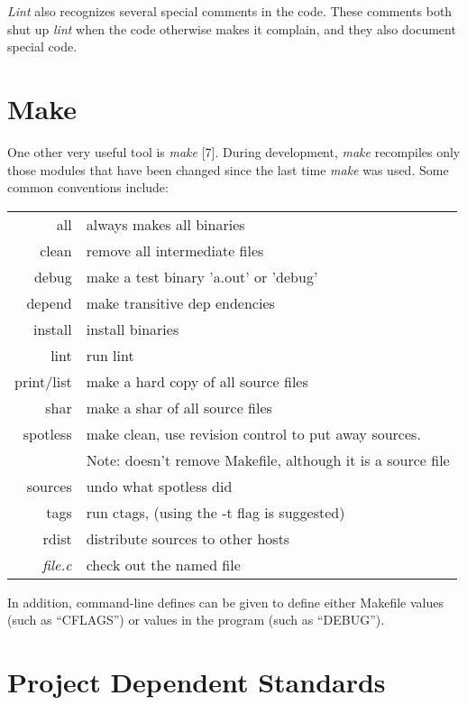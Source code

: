 {\em Lint} also recognizes several special comments in the code. These comments
both shut up {\em lint} when the code otherwise makes it complain, and they also
document special code. 

\section{Make}

 One other very useful tool is {\em make} [7]. During development, {\em make}
recompiles only those modules that have been changed since the last time
{\em make} was used. Some common conventions include: 
\vspace{.25in}

\begin{tabular}{r@{\,--\,}l}
all & always makes all binaries\\
clean & remove all intermediate files\\
debug & make a test binary 'a.out' or 'debug' \\
depend & make transitive dep
endencies \\
install & install binaries \\
lint & run lint \\
print/list & make a hard copy of all source files \\
shar & make a shar of all source files \\
spotless & make clean, use revision control to put away sources.  \\
 & Note: doesn't remove Makefile, although it is a source file \\
sources & undo what spotless did \\
tags & run ctags, (using the -t flag is suggested) \\
rdist & distribute sources to other hosts \\
{\em file.c} & check out the named file 
\end{tabular}
\vspace{.25in}

In addition, command-line defines can be given to define either Makefile values
(such as ``CFLAGS'') or values in the program (such as ``DEBUG''). 

\section{Project Dependent Standards}

